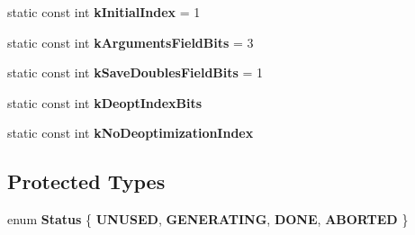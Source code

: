 \begin{DoxyCompactItemize}
\item 
\hypertarget{classv8_1_1internal_1_1_b_a_s_e___e_m_b_e_d_d_e_d_a69cc562a0ddcb0c83bfbd617384e39d9}{}static const int {\bfseries k\+Initial\+Index} = 1\label{classv8_1_1internal_1_1_b_a_s_e___e_m_b_e_d_d_e_d_a69cc562a0ddcb0c83bfbd617384e39d9}

\item 
\hypertarget{classv8_1_1internal_1_1_b_a_s_e___e_m_b_e_d_d_e_d_a7a8441089ee72681130bad72cfb9e464}{}static const int {\bfseries k\+Arguments\+Field\+Bits} = 3\label{classv8_1_1internal_1_1_b_a_s_e___e_m_b_e_d_d_e_d_a7a8441089ee72681130bad72cfb9e464}

\item 
\hypertarget{classv8_1_1internal_1_1_b_a_s_e___e_m_b_e_d_d_e_d_a413b937954e1e7413164351acc16e663}{}static const int {\bfseries k\+Save\+Doubles\+Field\+Bits} = 1\label{classv8_1_1internal_1_1_b_a_s_e___e_m_b_e_d_d_e_d_a413b937954e1e7413164351acc16e663}

\item 
static const int {\bfseries k\+Deopt\+Index\+Bits}
\item 
static const int {\bfseries k\+No\+Deoptimization\+Index}
\end{DoxyCompactItemize}
\subsection*{Protected Types}
\begin{DoxyCompactItemize}
\item 
\hypertarget{classv8_1_1internal_1_1_b_a_s_e___e_m_b_e_d_d_e_d_aa41d955c5807de96ccb4819b0f79ce78}{}enum {\bfseries Status} \{ {\bfseries U\+N\+U\+S\+E\+D}, 
{\bfseries G\+E\+N\+E\+R\+A\+T\+I\+N\+G}, 
{\bfseries D\+O\+N\+E}, 
{\bfseries A\+B\+O\+R\+T\+E\+D}
 \}\label{classv8_1_1internal_1_1_b_a_s_e___e_m_b_e_d_d_e_d_aa41d955c5807de96ccb4819b0f79ce78}

\end{DoxyCompactItemize}
